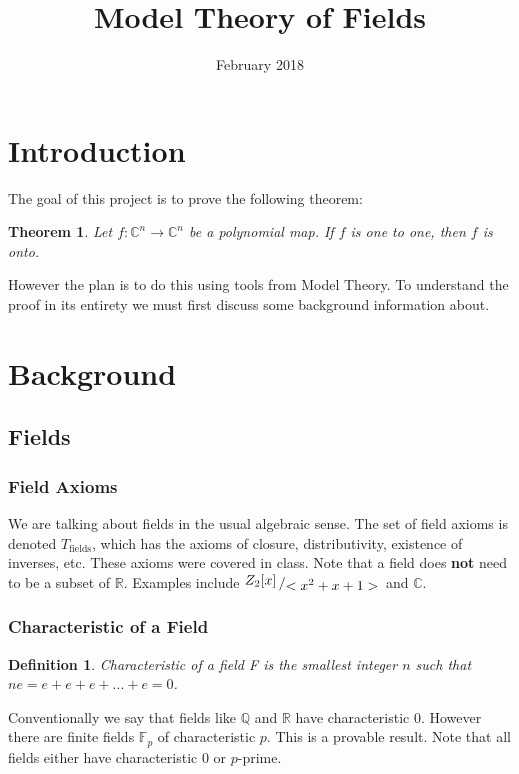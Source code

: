 \documentclass{article}
\title{Model Theory of Fields}
\date{February 2018}
\newtheorem{theorem}{Theorem}
\newtheorem{defn}{Definition}
\newcommand{\bigslant}[2]{{\raisebox{.2em}{$#1$}\left/\raisebox{-.2em}{$#2$}\right.}}
\begin{document}
\maketitle

\section{Introduction} The goal of this project is to prove the following theorem:
\begin{theorem}
    Let $f:\mathbb{C}^{n}\to \mathbb{C}^{n}$ be a polynomial map. If $f$ is one to one, then $f$ is onto.
\end{theorem}
However the plan is to do this using tools from Model Theory. To understand the proof in its entirety we must first discuss some background information about.


\section{Background}

\subsection{Fields} 
\subsubsection{Field Axioms}
We are talking about fields in the usual algebraic sense. The set of field axioms is denoted $T_{\text{fields}}$, which has the axioms of closure, distributivity, existence of inverses, etc. These axioms were covered in class. Note that a field does \textbf{not} need to be a subset of $\mathbb{R}$. Examples include $\bigslant{{Z}_{2}[x]}{<x^{2} + x + 1>}$ and $\mathbb{C}$.
\subsubsection{Characteristic of a Field}
\begin{defn}
Characteristic of a field F is the smallest integer $n$ such that $ne = e + e + e + ... + e = 0$.
\end{defn}

Conventionally we say that fields like $\mathbb{Q}$ and $\mathbb{R}$ have characteristic 0. However there are finite fields $\mathbb{F}_{p}$ of characteristic $p$. This is a provable result. Note that all fields either have characteristic $0$ or $p$-prime.\\[.07in]
\end{document}
